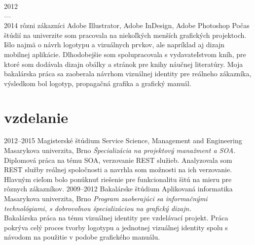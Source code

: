 \documentclass[]{friggeri-cv} %
\begin{document}
\begin{entrylist}
\job
{2012 \\ --- \\ 2014}
{rôzni zákazníci}
{}
{}
{
  {Adobe Illustrator, Adobe InDesign, Adobe Photoshop}
  {Počas štúdií na univerzite som pracovala na niekoľkých menších grafických projektoch. Išlo najmä o návrh logotypu a vizuálnych prvkov, ale napríklad aj dizajn mobilnej aplikácie. Dlhodobejšie som spolupracovala s vydavateľstvom kníh, pre ktoré som dodávala dizajn obálky a stránok pre knihy náučnej literatúry. Moja bakalárska práca sa zaoberala návrhom vizuálnej identity pre reálneho zákazníka, výsledkom bol logotyp, propagačná grafika a grafický manuál.}
}
\end{entrylist}



\section{vzdelanie}

\begin{entrylist}
\entry
{2012--2015}
{Magisterské štúdium {\normalfont Service Science, Management and Engineering}}
{Masarykova univerzita, Brno}
{\emph{Špecializácia na projektový manažment a SOA.} \\ Diplomová práca na tému SOA, verzovanie REST služieb. Analyzovala som REST služby reálnej spoločnosti a navrhla som možnosti na ich verzovanie. Hlavným cieľom bolo ponúknuť riešenie pre funkcionalitu šitú na mieru pre rôznych zákazníkov.}
\entry
{2009--2012}
{Bakalárske štúdium {\normalfont Aplikovaná informatika}}
{Masarykova univerzita, Brno}
{\emph{Program zaoberajúci sa informačnými technológiami, s dobrovoľnou špecializáciou na grafický dizajn.} \\ Bakalárska práca na tému vizuálnej identity pre vzdelávací projekt. Práca pokrýva celý proces tvorby logotypu a jednotnej vizuálnej identity spolu s návodom na použitie v podobe grafického manuálu.}
\end{entrylist}

\end{document}
